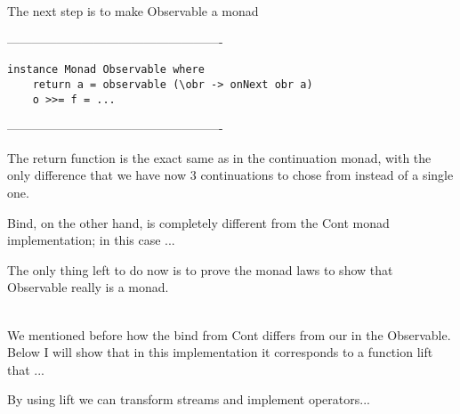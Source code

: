 The next step is to make Observable a monad

----------------------------------------------------
\begin{verbatim}
instance Monad Observable where
	return a = observable (\obr -> onNext obr a)
	o >>= f = ...
\end{verbatim}
----------------------------------------------------  

The return function is the exact same as in the continuation monad, with the only difference that we have now 3 continuations to chose from instead of a single one. 

Bind, on the other hand, is completely different from the Cont monad implementation; in this case ... 

The only thing left to do now is to prove the monad laws to show that Observable really is a monad.

\\

We mentioned before how the bind from Cont differs from our in the Observable. Below I will show that in this implementation it corresponds to a function lift that ... 

By using lift we can transform streams and implement operators...



